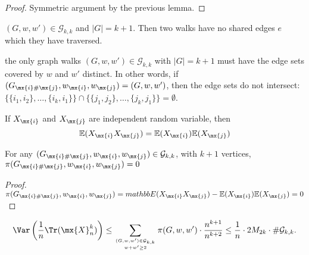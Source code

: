 \begin{lemma}\label{lem:walk_j_traverse_twice}
    \notready
    \begin{proof}
     Symmetric argument by the previous lemma.
    \end{proof}
\end{lemma}


\begin{lemma}\label{lem:no_shared_edges}
    $(G, w, w') \in \mathcal{G}_{k, k}$ and $|G| = k + 1$. Then two walks have no shared edges $e$ which they have traversed.
\end{lemma}


\begin{lemma}\label{lem:disjoint_edge_set}
    \notready
    the only graph walks $(G,w,w')\in \mathcal{G}_{k,k}$ with $|G|=k+1$ must have the edge sets covered by $w$ and $w'$ distinct.  
    In other words, if $(G_{\mx{i}\#\mx{j}},w_\mx{i},w_\mx{j}) = (G,w,w')$, then the edge sets do not intersect: 
    $\{\{i_1,i_2\},\ldots,\{i_k,i_1\}\}\cap\{\{j_1,j_2\},\ldots,\{j_k,j_1\}\}=\emptyset$. 
\end{lemma}



\begin{lemma}\label{lem:independent_expectation}
   \notready
   If $X_{\mx{i}}$ and $X_{\mx{j}}$ are independent random variable, then $$\mathbb{E}(X_{\mx{i}}X_{\mx{j}}) = \mathbb{E}(X_{\mx{i}})\mathbb{E}(X_{\mx{j}}) $$

\end{lemma}


\begin{lemma}\label{lem:G_leq_k}
    \notready
    For any $(G_{\mx{i}\#\mx{j}},w_\mx{i},w_\mx{j}) \in \mathcal{G}_{k,k}$, with $k + 1$ vertices, $\pi(G_{\mx{i}\#\mx{j}},w_\mx{i},w_\mx{j})  = 0$ 
    \begin{proof}
     $\pi(G_{\mx{i}\#\mx{j}},w_\mx{i},w_\mx{j}) = mathbb{E}(X_{\mx{i}}X_{\mx{j}}) - \mathbb{E}(X_{\mx{i}})\mathbb{E}(X_{\mx{j}})  = 0$
    \end{proof}
\end{lemma}


\begin{lemma}\label{lem:elimination_k+1}
    \notready

    \[ \Var\left( \frac1n\Tr(\mx{X}_n^k)\right) \le \sum_{(G,w,w')\in\mathcal{G}_{k,k}\atop w+w'\ge 2} \pi(G,w,w')\cdot \frac{n^{k+1}}{n^{k+2}} \le \frac1n\cdot 2M_{2k}\cdot \#\mathcal{G}_{k,k}. \]

\end{lemma}



